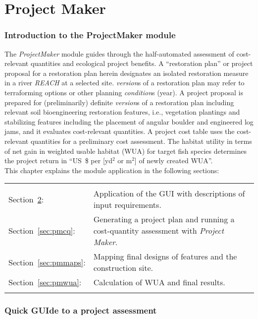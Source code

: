 \newpage
\part{Project Maker} \label{part:pm}

\section{Introduction to the ProjectMaker module} \label{sec:pmintro}
The \textit{ProjectMaker} module guides through the half-automated assessment of cost-relevant quantities and ecological project benefits. A ``restoration plan'' or project proposal for a restoration plan herein designates an isolated restoration measure in a river \emph{REACH} at a selected site. \emph{version}s of a restoration plan may refer to terraforming options or other planning \emph{condition}s (year). A project proposal is prepared for (preliminarily) definite \emph{version}s of a restoration plan including relevant soil bioengineering restoration features, i.e., vegetation plantings and stabilizing features including the placement of angular boulder and engineered log jams, and it evaluates cost-relevant quantities. A project cost table uses the cost-relevant quantities for a preliminary cost assessment. The habitat utility in terms of net gain in weighted usable habitat (WUA) for target fish species determines the project return in ``US~\$ per [yd$^2$ or m$^2$] of newly created WUA''.\\ 

This chapter explains the module application in the following sections:\\
\begin{tabular}{l L{0.9\textwidth}}
\\
Section~\ref{sec:pmquick}: & Application of the GUI with descriptions of input requirements.\\
Section~\ref{sec:pmcq}:  & Generating a project plan and running a cost-quantity assessment with \textit{Project Maker}.\\
Section~\ref{sec:pmmaps}:  & Mapping final designs of features and the construction site.\\
Section~\ref{sec:pmwua}:  & Calculation of WUA and final results.\\
\\
\end{tabular}


\section{Quick GUIde to a project assessment} \label{sec:pmquick}
